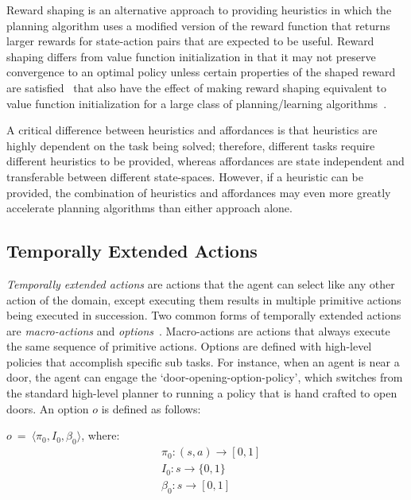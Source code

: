 \documentclass[]{article}
\newcommand{\jmnote}[1]{\textcolor{Green}{\textbf{JM: #1}}}
\begin{document}
Reward shaping is an alternative approach to providing heuristics in which the planning algorithm uses a modified version of the reward function that returns larger rewards for state-action pairs that are expected to be useful. Reward shaping differs from value function initialization in that it may not preserve convergence to an optimal policy unless certain properties of the shaped reward are satisfied~\cite{potshap} that also have the effect of making reward shaping equivalent to value function initialization for a large class of planning/learning algorithms~\cite{Wiewiora:2003fk}.

A critical difference between heuristics and affordances is that heuristics are highly dependent on the task being solved; therefore, different tasks require different heuristics to be provided, whereas affordances are state independent and transferable between different state-spaces. However, if a heuristic can be provided, the combination of heuristics and affordances may even more greatly accelerate planning algorithms than either approach alone.


\subsection{Temporally Extended Actions}

{\em Temporally extended actions} are actions that the agent can
select like any other action of the domain, except executing them
results in multiple primitive actions being executed in
succession. Two common forms of temporally extended actions are {\em
  macro-actions}%
  and {\em
  options}~\citep{sutton99}. Macro-actions are actions that always
execute the same sequence of primitive actions. Options are defined
with high-level policies that accomplish specific sub tasks. For
instance, when an agent is near a door, the agent can engage the
`door-opening-option-policy', which switches from the standard
high-level planner to running a policy that is hand crafted to open
doors. An option $o$ is defined as follows:

$o\ =\ \langle \pi_0, I_0, \beta_0\rangle$, where:
\begin{align*}
&\pi_0 : (s,a) \rightarrow [0,1] \\
&I_0 : s \rightarrow \{0,1\} \\
&\beta_0 : s \rightarrow [0,1]
\end{align*}
\end{document}
